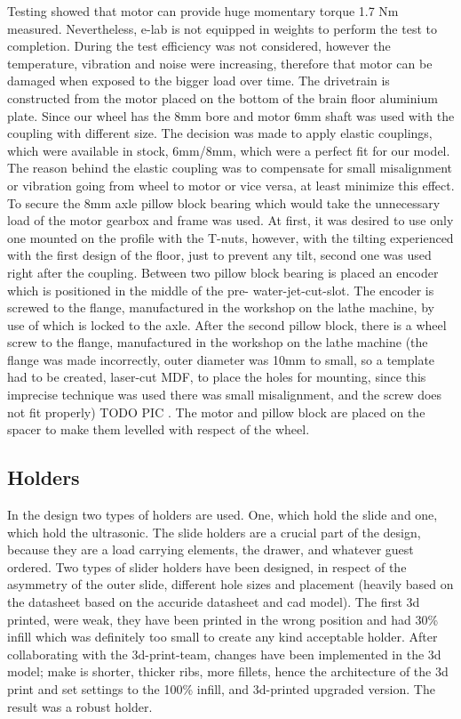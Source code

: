 \documentclass[11pt]{article}
\begin{document}
Testing showed that motor can provide huge momentary torque 1.7 Nm measured. Nevertheless, e-lab is not equipped in weights to perform the test to completion. During the test efficiency was not considered, however the temperature, vibration and noise were increasing, therefore that motor can be damaged when exposed to the bigger load over time.  
The drivetrain is constructed from the motor placed on the bottom of the brain floor aluminium plate. Since our wheel has the 8mm bore and motor 6mm shaft was used with the coupling with different size. The decision was made to apply elastic couplings, which were available in stock, 6mm/8mm, which were a perfect fit for our model. The reason behind the elastic coupling was to compensate for small misalignment or vibration going from wheel to motor or vice versa, at least minimize this effect. To secure the 8mm axle pillow block bearing which would take the unnecessary load of the motor gearbox and frame was used. At first, it was desired to use only one mounted on the profile with the T-nuts, however, with the tilting experienced with the first design of the floor, just to prevent any tilt, second one was used right after the coupling. Between two pillow block bearing is placed an encoder which is positioned in the middle of the pre- water-jet-cut-slot. The encoder is screwed to the flange, manufactured in the workshop on the lathe machine, by use of which is locked to the axle. After the second pillow block, there is a wheel screw to the flange, manufactured in the workshop on the lathe machine (the flange was made incorrectly, outer diameter was 10mm to small, so a template had to be created, laser-cut MDF, to place the holes for mounting, since this imprecise technique was used there was small misalignment, and the screw does not fit properly) TODO PIC . The motor and pillow block are placed on the spacer to make them levelled with respect of the wheel.

\subsection*{Holders}
In the design two types of holders are used. One, which hold the slide and one, which hold the ultrasonic. The slide holders are a crucial part of the design, because they are a load carrying elements, the drawer, and whatever guest ordered. Two types of slider holders have been designed, in respect of the asymmetry of the outer slide, different hole sizes and placement (heavily based on the datasheet based on the accuride datasheet and cad model). The first 3d printed, were weak, they have been printed in the wrong position and had 30\% infill which was definitely too small to create any kind acceptable holder. After collaborating with the 3d-print-team, changes have been implemented in the 3d model; make is shorter, thicker ribs, more fillets, hence the architecture of the 3d print and set settings to the 100\% infill, and 3d-printed upgraded version. The result was a robust holder.
\end{document}
